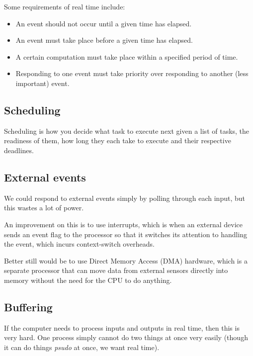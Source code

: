 Some requirements of real time include:

\begin{mymulticols}
  \begin{itemize}
    \item An event should not occur until a given time has elapsed.
    \item An event must take place before a given time has elapsed.
    \item A certain computation must take place within a specified period of
      time.
    \item Responding to one event must take priority over responding to another
      (less important) event.
  \end{itemize}
\end{mymulticols}

\subsection{Scheduling}

Scheduling is how you decide what task to execute next given a list of tasks,
the readiness of them, how long they each take to execute and their respective
deadlines.

\subsection{External events}

We could respond to external events simply by polling through each input, but
this wastes a lot of power.

An improvement on this is to use interrupts, which is when an external device
sends an event flag to the processor so that it switches its attention to
handling the event, which incurs context-switch overheads.

Better still would be to use Direct Memory Access (DMA) hardware, which is a
separate processor that can move data from external sensors directly into memory
without the need for the CPU to do anything.

\subsection{Buffering}

If the computer needs to process inputs and outputs in real time, then this is
very hard. One process simply cannot do two things at once very easily (though
it can do things \textit{psudo} at once, we want real time).

